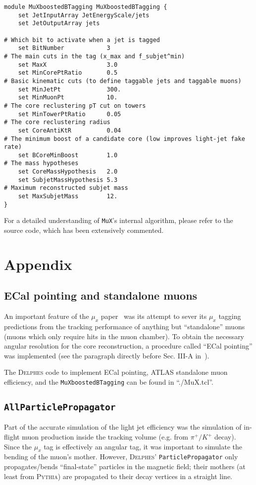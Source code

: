 \documentclass[10pt]{article}
\newcommand{\muX}{$\mu_{x}^{}$}
\newcommand{\muXmodFull}{\texttt{MuXboostedBTagging}}
\newcommand{\muXmod}{\texttt{MuX}}
\newcommand{\delphes}{\textsc{Delphes}}
\begin{document}
\begin{lstlisting}
module MuXboostedBTagging MuXboostedBTagging {
    set JetInputArray JetEnergyScale/jets
    set JetOutputArray jets

# Which bit to activate when a jet is tagged
    set BitNumber            3
# The main cuts in the tag (x_max and f_subjet^min)
    set MaxX                 3.0
    set MinCorePtRatio       0.5
# Basic kinematic cuts (to define taggable jets and taggable muons)
    set MinJetPt             300.
    set MinMuonPt            10.
# The core reclustering pT cut on towers
    set MinTowerPtRatio      0.05
# The core reclustering radius
    set CoreAntiKtR          0.04
# The minimum boost of a candidate core (low improves light-jet fake rate)
    set BCoreMinBoost        1.0
# The mass hypotheses
    set CoreMassHypothesis   2.0
    set SubjetMassHypothesis 5.3
# Maximum reconstructed subjet mass
    set MaxSubjetMass        12.
}
\end{lstlisting}

For a detailed understanding of {\muXmod}'s internal algorithm, please refer
to the source code, which has been extensively commented.

\section{Appendix}
\subsection{ECal pointing and standalone muons}

An important feature of the {\muX} paper~\cite{Pedersen:MuX} was its attempt to
sever its {\muX} tagging predictions from the tracking performance of
anything but ``standalone'' muons (muons which only require hits in the muon
chamber). To obtain the necessary angular resolution for the core
reconstruction, a procedure called ``ECal pointing'' was implemented (see the
paragraph directly before Sec. III-A in~\cite{Pedersen:MuX}).

The {\delphes} code to implement ECal pointing, ATLAS standalone muon
efficiency, and the {\muXmodFull} can be found in ``./MuX.tcl''.

\subsection{\texttt{AllParticlePropagator}}

Part of the accurate simulation of the light jet efficiency was the simulation
of in-flight muon production inside the tracking volume (e.g. from
$\pi^{+}/K^{+}$ decay). Since the {\muX} tag is effectively an angular tag, it
was important to simulate the bending of the muon's mother. However, {\delphes}'
\texttt{ParticlePropagator} only propagates/bends ``final-state'' particles in
the magnetic field; their mothers (at least from \textsc{Pythia}) are propagated
to their decay vertices in a straight line.
\end{document}
